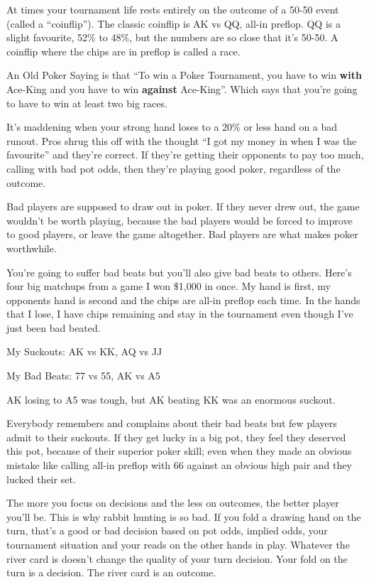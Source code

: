 At times your tournament life rests entirely on the outcome of
a 50-50 event (called a ``coinflip'').
The classic coinflip is AK vs QQ, all-in preflop. QQ is a slight
favourite, 52\% to 48\%, but the numbers are so close that it's 50-50.
A coinflip where the chips are in preflop is called a race.

An Old Poker Saying is that ``To win a
Poker Tournament, you have to win \textbf{with} Ace-King and
you have to win \textbf{against} Ace-King''. Which says that you're
going to have to win at least two big races.

It's maddening when your strong hand loses to a 20\% or less
hand on a bad runout. Pros shrug this off with
the thought ``I got my money in when I was the favourite'' and they're
correct. If they're getting their opponents to pay too much, calling
with bad pot odds, then they're playing good poker, regardless of
the outcome.

Bad players are supposed to draw out in poker. If they never drew
out, the game wouldn't be worth playing, because the bad players
would be forced to improve to good players, or leave the game
altogether. Bad players are what makes poker worthwhile.

You're going to suffer bad beats but you'll also give bad beats
to others. Here's four big matchups from a game
I won \$1,000 in once. My hand is first, my opponents hand is second
and the chips are all-in preflop each time. In the hands that I
lose, I have chips remaining and stay in the tournament even
though I've just been bad beated.

My Suckouts: AK vs KK, AQ vs JJ

My Bad Beats: 77 vs 55, AK vs A5

AK losing to A5 was tough, but AK beating KK was an enormous suckout.

Everybody remembers and complains about their bad beats but few
players admit to their suckouts. If they get lucky in a big pot, they
feel they deserved this pot, because of their superior poker skill;
even when they made an obvious mistake like calling all-in preflop
with 66 against an obvious high pair and they lucked their set.


The more you focus on decisions and the less on outcomes, the
better player you'll be. This is why rabbit hunting is so bad. If
you fold a drawing hand on the turn, that's a good or bad decision
based on pot odds, implied odds, your tournament situation
and your reads on the other hands in play. Whatever the river card is
doesn't change the quality of your turn decision. Your fold on the
turn is a decision. The river card is an outcome.

